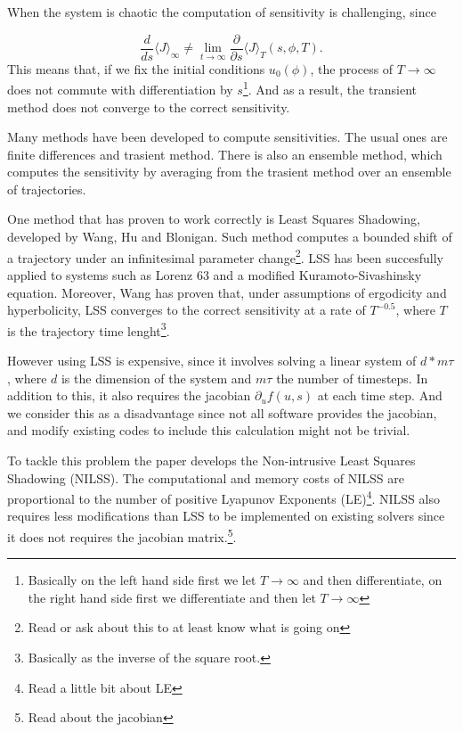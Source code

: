 \documentclass[12pt,twoside,a4paper]{article} %
\begin{document}
When the system is chaotic the computation of sensitivity is challenging, since

\begin{equation}
  \frac{d}{ds} \langle J \rangle_\infty \neq \lim_{t\to \infty} \frac{\partial}{\partial s} \langle J \rangle_T (s,\phi,T).
\end{equation}
This means that, if we fix the initial conditions $u_0(\phi)$, the process of $T\to\infty$ does not commute with differentiation by $s$\footnote{Basically on the left hand side first we let $T\to\infty$ and then differentiate, on the right hand side first we differentiate and then let $T\to\infty$}. And as a result, the transient method does not converge to the correct sensitivity.

Many methods have been developed to compute sensitivities. The usual ones are finite differences and trasient method. There is also an ensemble method, which computes the sensitivity by averaging from the trasient method over an ensemble of trajectories.

One method that has proven to work correctly is Least Squares Shadowing, developed by Wang, Hu and Blonigan. Such method computes a bounded shift of a trajectory under an infinitesimal parameter change\footnote{Read or ask about this to at least know what is going on}. LSS has been succesfully applied to systems such as Lorenz 63 and a modified Kuramoto-Sivashinsky equation. Moreover, Wang has proven that, under assumptions of ergodicity and hyperbolicity, LSS converges to the correct sensitivity at a rate of $T^{-0.5}$, where $T$ is the trajectory time lenght\footnote{Basically as the inverse of the square root.}.

However using LSS is expensive, since it involves solving a linear system of $d*m\tau$, where $d$ is the dimension of the system and $m\tau$ the number of timesteps. In addition to this, it also requires the jacobian $\partial_uf(u,s)$ at each time step. And we consider this as a disadvantage since not all software provides the jacobian, and modify existing codes to include this calculation might not be trivial.

To tackle this problem the paper develops the Non-intrusive Least Squares Shadowing (NILSS). The computational and memory costs of NILSS are proportional to the number of positive Lyapunov Exponents (LE)\footnote{Read a little bit about LE}. NILSS also requires less modifications than LSS to be implemented on existing solvers since it does not requires the jacobian matrix.\footnote{Read about the jacobian}.
\end{document}
